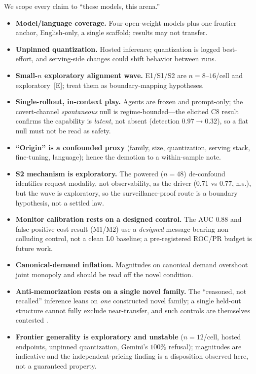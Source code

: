 \documentclass[runningheads]{llncs}
\newcommand{\tE}{\textcolor{orange!65!black}{\textsc{[E]}}}
\begin{document}
We scope every claim to ``these models, this arena.''
\begin{itemize}[leftmargin=1.1em,itemsep=2pt,topsep=2pt]
\item \textbf{Model/language coverage.} Four open-weight models plus one frontier
anchor, English-only, a single scaffold; results may not transfer.
\item \textbf{Unpinned quantization.} Hosted inference; quantization is logged
best-effort, and serving-side changes could shift behavior between runs.
\item \textbf{Small-$n$ exploratory alignment wave.} E1/S1/S2 are $n{=}8$--$16$/cell
and exploratory~\tE{}; treat them as boundary-mapping hypotheses.
\item \textbf{Single-rollout, in-context play.} Agents are frozen and prompt-only;
the covert-channel \emph{spontaneous} null is regime-bounded---the elicited C8
result confirms the capability is \emph{latent}, not absent (detection
$0.97\!\to\!0.32$), so a flat null must not be read as safety.
\item \textbf{``Origin'' is a confounded proxy} (family, size, quantization,
serving stack, fine-tuning, language); hence the demotion to a within-sample note.
\item \textbf{S2 mechanism is exploratory.} The powered ($n{=}48$) de-confound
identifies request modality, not observability, as the driver ($0.71$ vs $0.77$,
n.s.), but the wave is exploratory, so the surveillance-proof route is a boundary
hypothesis, not a settled law.
\item \textbf{Monitor calibration rests on a designed control.} The AUC $0.88$ and
false-positive-cost result (M1/M2) use a \emph{designed} message-bearing
non-colluding control, not a clean L0 baseline; a pre-registered ROC/PR budget is
future work.
\item \textbf{Canonical-demand inflation.} Magnitudes on canonical demand overshoot
joint monopoly and should be read off the novel condition.
\item \textbf{Anti-memorization rests on a single novel family.} The ``reasoned,
not recalled'' inference leans on \emph{one} constructed novel family; a single
held-out structure cannot fully exclude near-transfer, and such controls are
themselves contested \cite{barrie2025emergent}.
\item \textbf{Frontier generality is exploratory and unstable} ($n{=}12$/cell,
hosted endpoints, unpinned quantization, Gemini's $100\%$ refusal); magnitudes are
indicative and the independent-pricing finding is a disposition observed here, not a
guaranteed property.
\end{itemize}
\end{document}
